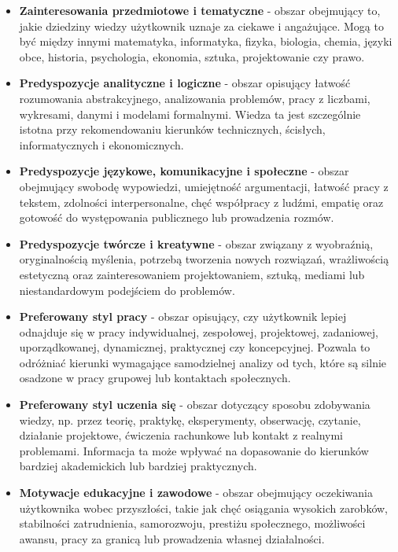\documentclass[12pt,a4paper,oneside]{article}
\begin{document}
\begin{itemize}[leftmargin=1.2cm]
    \item \textbf{Zainteresowania przedmiotowe i tematyczne} - obszar obejmujący to, jakie dziedziny wiedzy użytkownik uznaje za ciekawe i angażujące. Mogą to być między innymi matematyka, informatyka, fizyka, biologia, chemia, języki obce, historia, psychologia, ekonomia, sztuka, projektowanie czy prawo.

    \item \textbf{Predyspozycje analityczne i logiczne} - obszar opisujący łatwość rozumowania abstrakcyjnego, analizowania problemów, pracy z liczbami, wykresami, danymi i modelami formalnymi. Wiedza ta jest szczególnie istotna przy rekomendowaniu kierunków technicznych, ścisłych, informatycznych i ekonomicznych.

    \item \textbf{Predyspozycje językowe, komunikacyjne i społeczne} - obszar obejmujący swobodę wypowiedzi, umiejętność argumentacji, łatwość pracy z tekstem, zdolności interpersonalne, chęć współpracy z ludźmi, empatię oraz gotowość do występowania publicznego lub prowadzenia rozmów.

    \item \textbf{Predyspozycje twórcze i kreatywne} - obszar związany z wyobraźnią, oryginalnością myślenia, potrzebą tworzenia nowych rozwiązań, wrażliwością estetyczną oraz zainteresowaniem projektowaniem, sztuką, mediami lub niestandardowym podejściem do problemów.

    \item \textbf{Preferowany styl pracy} - obszar opisujący, czy użytkownik lepiej odnajduje się w pracy indywidualnej, zespołowej, projektowej, zadaniowej, uporządkowanej, dynamicznej, praktycznej czy koncepcyjnej. Pozwala to odróżniać kierunki wymagające samodzielnej analizy od tych, które są silnie osadzone w pracy grupowej lub kontaktach społecznych.

    \item \textbf{Preferowany styl uczenia się} - obszar dotyczący sposobu zdobywania wiedzy, np. przez teorię, praktykę, eksperymenty, obserwację, czytanie, działanie projektowe, ćwiczenia rachunkowe lub kontakt z realnymi problemami. Informacja ta może wpływać na dopasowanie do kierunków bardziej akademickich lub bardziej praktycznych.

    \item \textbf{Motywacje edukacyjne i zawodowe} - obszar obejmujący oczekiwania użytkownika wobec przyszłości, takie jak chęć osiągania wysokich zarobków, stabilności zatrudnienia, samorozwoju, prestiżu społecznego, możliwości awansu, pracy za granicą lub prowadzenia własnej działalności.


\end{itemize}
\end{document}
